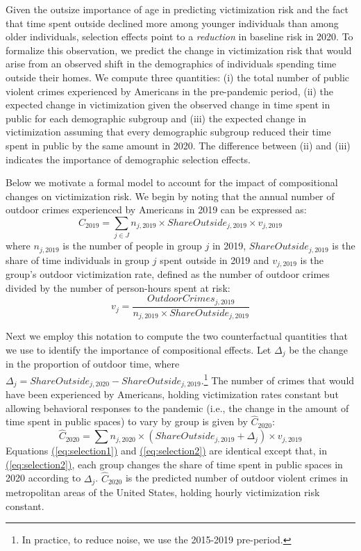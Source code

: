 Given the outsize importance of age in predicting victimization risk and the fact that time spent outside declined more among younger individuals than among older individuals, selection effects point to a \emph{reduction} in baseline risk in 2020. To formalize this observation, we predict the change in victimization risk that would arise from an observed shift in the demographics of individuals spending time outside their homes. We compute three quantities: (i) the total number of public violent crimes experienced by Americans in the pre-pandemic period, (ii) the expected change in victimization given the observed change in time spent in public for each demographic subgroup and (iii) the expected change in victimization assuming that every demographic subgroup reduced their time spent in public by the same amount in 2020. The difference between (ii) and (iii) indicates the importance of demographic selection effects. 

Below we motivate a formal model to account for the impact of compositional changes on victimization risk. We begin by noting that the annual number of outdoor crimes experienced by Americans in 2019 can be expressed as:
\begin{equation} \label{eq:selection1}
C_{2019} = \sum_{j \in J} n_{j,2019} \times ShareOutside_{j,2019} \times v_{j,2019}
\end{equation}
where $n_{j,2019}$ is the number of people in group $j$ in 2019, $ShareOutside_{j,2019}$ is the share of time individuals in group $j$ spent outside in 2019 and $v_{j,2019}$ is the group's outdoor victimization rate, defined as the number of outdoor crimes divided by the number of person-hours spent at risk:
\[
v_j = \frac{OutdoorCrimes_{j,2019}}{n_{j,2019}  \times ShareOutside_{j,2019}}
\]

Next we employ this notation to compute the two counterfactual quantities that we use to identify the importance of compositional effects. Let $\Delta_j$ be the change in the proportion of outdoor time, where $\Delta_j= ShareOutside_{j,2020} - ShareOutside_{j,2019}$.\footnote{In practice, to reduce noise, we use the 2015-2019 pre-period.} The number of crimes that would have been experienced by Americans, holding victimization rates constant but allowing behavioral responses to the pandemic (i.e., the change in the amount of time spent in public spaces) to vary by group is given by $\hat{C}_{2020}$:
\begin{equation} \label{eq:selection2}
\hat{C}_{2020} = \sum n_{j,2020} \times (ShareOutside_{j,2019} +\Delta_j) \times v_{j,2019}
\end{equation}
Equations \href{eq:selection1}{(\ref{eq:selection1})} and \href{eq:selection2}{(\ref{eq:selection2})} are identical except that, in \href{eq:selection2}{(\ref{eq:selection2})}, each group changes the share of time spent in public spaces in 2020 according to $\Delta_{j}$. $\hat{C}_{2020}$ is the predicted number of outdoor violent crimes in metropolitan areas of the United States, holding hourly victimization risk constant.


